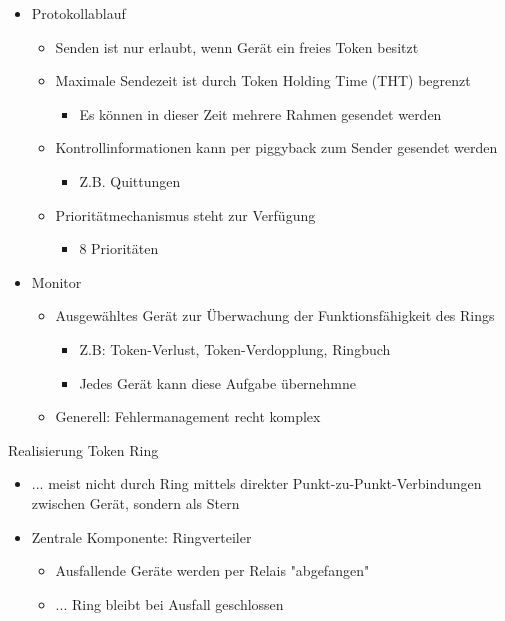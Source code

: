       \begin{itemize}
        \item Protokollablauf
          \begin{itemize}
            \item Senden ist nur erlaubt, wenn Gerät ein freies Token besitzt
            \item Maximale Sendezeit ist durch Token Holding Time (THT) begrenzt
              \begin{itemize}
                \item Es können in dieser Zeit mehrere Rahmen gesendet werden
              \end{itemize}
            \item Kontrollinformationen kann per piggyback zum Sender gesendet werden
              \begin{itemize}
                \item Z.B. Quittungen
              \end{itemize}
            \item Prioritätmechanismus steht zur Verfügung
              \begin{itemize}
                \item 8 Prioritäten
              \end{itemize}
          \end{itemize}
        \item Monitor
          \begin{itemize}
            \item Ausgewähltes Gerät zur Überwachung der Funktionsfähigkeit des Rings
              \begin{itemize}
                \item Z.B: Token-Verlust, Token-Verdopplung, Ringbuch
                \item Jedes Gerät kann diese Aufgabe übernehmne
              \end{itemize}
            \item Generell: Fehlermanagement recht komplex
          \end{itemize}
      \end{itemize}
      Realisierung Token Ring
      \begin{itemize}
        \item ... meist nicht durch Ring mittels direkter Punkt-zu-Punkt-Verbindungen zwischen Gerät,
          sondern als Stern
        \item Zentrale Komponente: Ringverteiler
          \begin{itemize}
            \item Ausfallende Geräte werden per Relais "abgefangen"
            \item ... Ring bleibt bei Ausfall geschlossen
          \end{itemize}
      \end{itemize}

